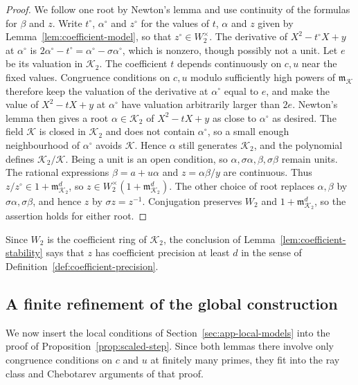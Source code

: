 \documentclass[11pt]{article}
\theoremstyle{plain}
\theoremstyle{definition}
\theoremstyle{remark}
\begin{document}
\begin{proof}
We follow one root by Newton's lemma and use continuity of the formulas
for $\beta$ and $z$.  Write $t^\circ$, $\alpha^\circ$ and $z^\circ$ for
the values of $t$, $\alpha$ and $z$ given by
Lemma~\ref{lem:coefficient-model}, so that $z^\circ\in W_2^\times$.  The
derivative of $X^2-t^\circ X+y$ at $\alpha^\circ$ is
$2\alpha^\circ-t^\circ=\alpha^\circ-\sigma\alpha^\circ$, which is
nonzero, though possibly not a unit.  Let $e$ be its valuation in
$\mathcal K_2$.  The coefficient $t$ depends continuously on $c,u$ near
the fixed values.  Congruence conditions on $c,u$ modulo sufficiently
high powers of $\mathfrak m_{\mathcal K}$ therefore keep the valuation
of the derivative at $\alpha^\circ$ equal to $e$, and make the value of
$X^2-tX+y$ at $\alpha^\circ$ have valuation arbitrarily larger than
$2e$.  Newton's lemma \cite[Theorem~7.32]{MilneANT} then gives a root
$\alpha\in\mathcal K_2$ of $X^2-tX+y$ as close to $\alpha^\circ$ as
desired.  The field $\mathcal K$ is closed in $\mathcal K_2$ and does
not contain $\alpha^\circ$, so a small enough neighbourhood of
$\alpha^\circ$ avoids $\mathcal K$.  Hence $\alpha$ still generates
$\mathcal K_2$, and the polynomial defines $\mathcal K_2/\mathcal K$.
Being a unit is an open condition, so $\alpha,\sigma\alpha,\beta,
\sigma\beta$ remain units.  The rational expressions
$\beta=a+u\alpha$ and $z=\alpha\beta/y$ are continuous.  Thus
$z/z^\circ\in1+\mathfrak m_{\mathcal K_2}^d$, so
$z\in W_2^\times(1+\mathfrak m_{\mathcal K_2}^d)$.  The other choice of
root replaces $\alpha,\beta$ by $\sigma\alpha,\sigma\beta$, and hence $z$
by $\sigma z=z^{-1}$.  Conjugation preserves $W_2$ and
$1+\mathfrak m_{\mathcal K_2}^d$, so the assertion holds for either root.
\end{proof}

Since $W_2$ is the coefficient ring of $\mathcal K_2$, the conclusion of
Lemma~\ref{lem:coefficient-stability} says that $z$ has coefficient
precision at least $d$ in the sense of
Definition~\ref{def:coefficient-precision}.

\subsection{A finite refinement of the global construction}\label{sec:app-finite-refinement}

We now insert the local conditions of
Section~\ref{sec:app-local-models} into the proof of
Proposition~\ref{prop:scaled-step}.  Since both lemmas there involve
only congruence conditions on $c$ and $u$ at finitely many primes, they
fit into the ray class and Chebotarev arguments of that proof.
\end{document}
